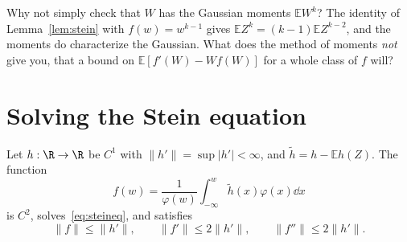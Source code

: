 \begin{think}
Why not simply check that $W$ has the Gaussian moments $\mathbb EW^k$? The identity of Lemma~\ref{lem:stein} with $f(w)=w^{k-1}$ gives
$\mathbb EZ^k=(k-1)\mathbb EZ^{k-2}$, and the moments do characterize the Gaussian. What does the method of moments \emph{not} give you, that a bound on
$\mathbb E[f'(W)-Wf(W)]$ for a whole class of $f$ will?
\end{think}

\section{Solving the Stein equation}

\begin{lemma}\label{lem:steinsol}
Let $h:\R\to\R$ be $C^1$ with $\|h'\|=\sup|h'|<\infty$, and $\tilde h=h-\mathbb Eh(Z)$. The function
\[
f(w)=\frac1{\varphi(w)}\int_{-\infty}^w\tilde h(x)\varphi(x)\dd x
\]
is $C^2$, solves~\eqref{eq:steineq}, and satisfies
\[
\|f\|\le\|h'\|,\qquad\|f'\|\le2\|h'\|,\qquad\|f''\|\le2\|h'\|.
\]
\end{lemma}
